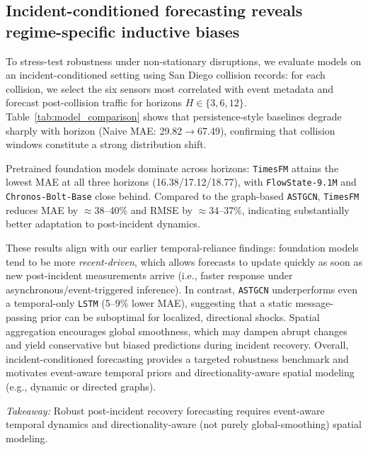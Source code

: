 \documentclass[10pt]{article}
\begin{document}
\subsection{Incident-conditioned forecasting reveals regime-specific inductive biases}
\label{sec:incident}

To stress-test robustness under non-stationary disruptions, we evaluate models on an incident-conditioned
setting using San Diego collision records: for each collision, we select the six sensors most correlated with
event metadata and forecast post-collision traffic for horizons $H\in\{3,6,12\}$.
Table~\ref{tab:model_comparison} shows that persistence-style baselines degrade sharply with horizon
(Naive MAE: 29.82$\rightarrow$67.49), confirming that collision windows constitute a strong distribution shift.

Pretrained foundation models dominate across horizons: \texttt{TimesFM} attains the lowest MAE at all
three horizons (16.38/17.12/18.77), with \texttt{FlowState-9.1M} and \texttt{Chronos-Bolt-Base} close behind.
Compared to the graph-based \texttt{ASTGCN}, \texttt{TimesFM} reduces MAE by $\approx$38--40\% and RMSE by
$\approx$34--37\%, indicating substantially better adaptation to post-incident dynamics.

These results align with our earlier temporal-reliance findings: foundation models tend to be more
\emph{recent-driven}, which allows forecasts to update quickly as soon as new post-incident measurements arrive
(i.e., faster response under asynchronous/event-triggered inference). In contrast, \texttt{ASTGCN} underperforms
even a temporal-only \texttt{LSTM} (5--9\% lower MAE), suggesting that a static message-passing prior can be
suboptimal for localized, directional shocks. Spatial aggregation encourages global smoothness, which may dampen
abrupt changes and yield conservative but biased predictions during incident recovery.
Overall, incident-conditioned forecasting provides a targeted robustness
benchmark and motivates event-aware temporal priors and directionality-aware spatial modeling (e.g., dynamic or
directed graphs).

\begin{keydiscovery1}
    \textit{Takeaway:}
Robust post-incident recovery forecasting requires event-aware temporal dynamics and directionality-aware (not
purely global-smoothing) spatial modeling.
\end{keydiscovery1}
\end{document}
